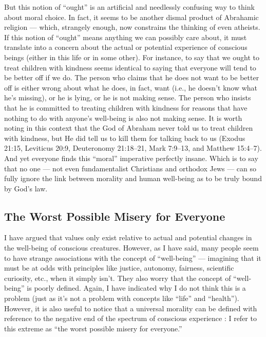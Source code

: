 \documentclass[a4paper,14pt]{extbook}
\begin{document}
But this notion of ``ought'' is an artificial and needlessly confusing way to think about moral choice.
In fact, it seems to be another dismal product of Abrahamic religion --- which, strangely enough, now constrains the thinking of even atheists.
If this notion of ``ought'' means anything we can possibly care about, it must translate into a concern about the actual or potential experience of conscious beings (either in this life or in some other).
For instance, to say that we ought to treat children with kindness seems identical to saying that everyone will tend to be better off if we do.
The person who claims that he does not want to be better off is either wrong about what he does, in fact, want (i.e., he doesn't know what he's missing), or he is lying, or he is not making sense.
The person who insists that he is committed to treating children with kindness for reasons that have nothing to do with anyone's well-being is also not making sense.
It is worth noting in this context that the God of Abraham never told us to treat children with kindness, but He did tell us to kill them for talking back to us (Exodus 21:15, Leviticus 20:9, Deuteronomy 21:18–21, Mark 7:9–13, and Matthew 15:4–7).
And yet everyone finds this ``moral'' imperative perfectly insane.
Which is to say that no one --- not even fundamentalist Christians and orthodox Jews --- can so fully ignore the link between morality and human well-being as to be truly bound by God's law.

\subsection{The Worst Possible Misery for Everyone}

I have argued that values only exist relative to actual and potential changes in the well-being of conscious creatures.
However, as I have said, many people seem to have strange associations with the concept of ``well-being'' --- imagining that it must be at odds with principles like justice, autonomy, fairness, scientific curiosity, etc., when it simply isn't.
They also worry that the concept of “well-being” is poorly defined.
Again, I have indicated why I do not think this is a problem (just as it's not a problem with concepts like ``life'' and ``health'').
However, it is also useful to notice that a universal morality can be defined with reference to the negative end of the spectrum of conscious experience : I
refer to this extreme as ``the worst possible misery for everyone.''
\end{document}
